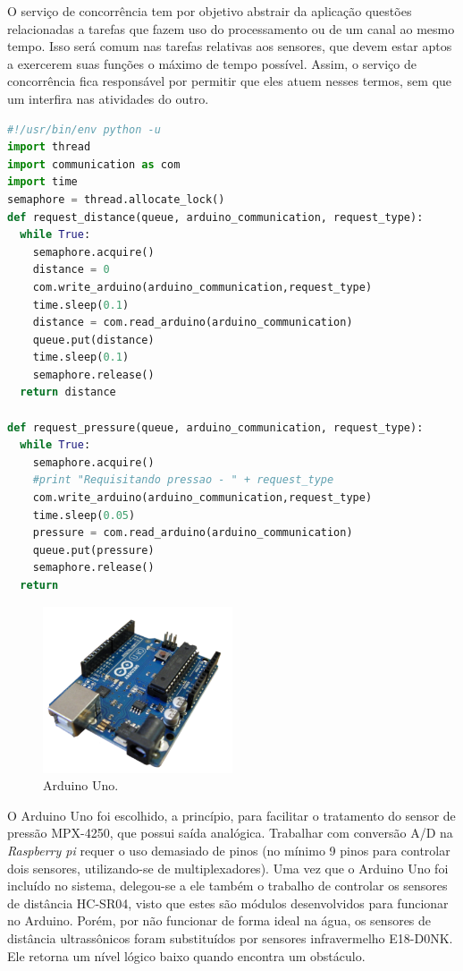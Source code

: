O serviço de concorrência tem por objetivo abstrair da aplicação questões relacionadas a tarefas que fazem uso do processamento ou de um canal ao mesmo tempo. Isso será comum nas tarefas relativas aos sensores, que devem estar aptos a exercerem suas funções o máximo de tempo possível. Assim, o serviço de concorrência fica responsável por permitir que eles atuem nesses termos, sem que um interfira nas atividades do outro.

\begin{lstlisting}[language=Python, label=threads, caption=Camada de Concorrência]
#!/usr/bin/env python -u
import thread
import communication as com
import time
semaphore = thread.allocate_lock()
def request_distance(queue, arduino_communication, request_type):
  while True:
    semaphore.acquire()
    distance = 0
    com.write_arduino(arduino_communication,request_type)
    time.sleep(0.1)
    distance = com.read_arduino(arduino_communication)
    queue.put(distance)
    time.sleep(0.1)
    semaphore.release()
  return distance

def request_pressure(queue, arduino_communication, request_type):
  while True:
    semaphore.acquire()
    #print "Requisitando pressao - " + request_type
    com.write_arduino(arduino_communication,request_type)
    time.sleep(0.05)
    pressure = com.read_arduino(arduino_communication)
    queue.put(pressure)
    semaphore.release()
  return
\end{lstlisting}

\begin{figure}[h]
  \centering
  \includegraphics[width=0.5\textwidth]{figuras/arduino.png}
  \caption{Arduino Uno.}
  \label{fig:arduino}
\end{figure}
\FloatBarrier

O Arduino Uno foi escolhido, a princípio, para facilitar o tratamento do sensor de pressão MPX-4250, que possui saída analógica. Trabalhar com   conversão A/D na \textit{Raspberry pi} requer o uso demasiado de pinos (no mínimo 9 pinos para controlar dois sensores, utilizando-se de multiplexadores).  Uma vez que o Arduino Uno foi incluído no sistema, delegou-se  a ele também o trabalho de controlar os sensores de distância HC-SR04, visto  que  estes são módulos desenvolvidos para funcionar no Arduino. Porém, por não funcionar de forma ideal na água, os sensores de distância ultrassônicos foram substituídos por  sensores infravermelho E18-D0NK. Ele retorna um nível lógico baixo quando encontra um obstáculo.

